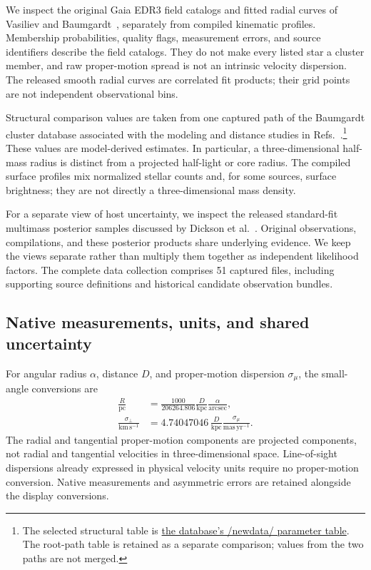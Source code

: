 \documentclass[aps,prd,reprint,amsmath,amssymb,superscriptaddress,nofootinbib,longbibliography,floatfix]{revtex4-2}
\begin{document}
We inspect the original Gaia EDR3 field catalogs and fitted radial curves of Vasiliev and Baumgardt~\cite{Vasiliev2021}, separately from compiled kinematic profiles. Membership probabilities, quality flags, measurement errors, and source identifiers describe the field catalogs. They do not make every listed star a cluster member, and raw proper-motion spread is not an intrinsic velocity dispersion. The released smooth radial curves are correlated fit products; their grid points are not independent observational bins.

Structural comparison values are taken from one captured path of the Baumgardt cluster database associated with the modeling and distance studies in Refs.~\cite{Baumgardt2018,Baumgardt2021}.\footnote{The selected structural table is \href{https://people.smp.uq.edu.au/HolgerBaumgardt/globular/newdata/parameter.html}{the database's /newdata/ parameter table}. The root-path table is retained as a separate comparison; values from the two paths are not merged.} These values are model-derived estimates. In particular, a three-dimensional half-mass radius is distinct from a projected half-light or core radius. The compiled surface profiles mix normalized stellar counts and, for some sources, surface brightness; they are not directly a three-dimensional mass density.

For a separate view of host uncertainty, we inspect the released standard-fit multimass posterior samples discussed by Dickson et al.~\cite{Dickson2023,Dickson2024}. Original observations, compilations, and these posterior products share underlying evidence. We keep the views separate rather than multiply them together as independent likelihood factors. The complete data collection comprises 51 captured files, including supporting source definitions and historical candidate observation bundles.

\subsection{Native measurements, units, and shared uncertainty}

For angular radius $\alpha$, distance $D$, and proper-motion dispersion $\sigma_\mu$, the small-angle conversions are
\begin{align}
\frac{R}{\mathrm{pc}}&=
\frac{1000}{206264.806}
\frac{D}{\mathrm{kpc}}\frac{\alpha}{\mathrm{arcsec}},
\label{eq:angular-conversion}\\
\frac{\sigma_\perp}{\mathrm{km\,s^{-1}}}&=
4.74047046\,
\frac{D}{\mathrm{kpc}}
\frac{\sigma_\mu}{\mathrm{mas\,yr^{-1}}}.
\label{eq:pm-conversion}
\end{align}
The radial and tangential proper-motion components are projected components, not radial and tangential velocities in three-dimensional space. Line-of-sight dispersions already expressed in physical velocity units require no proper-motion conversion. Native measurements and asymmetric errors are retained alongside the display conversions.
\end{document}
